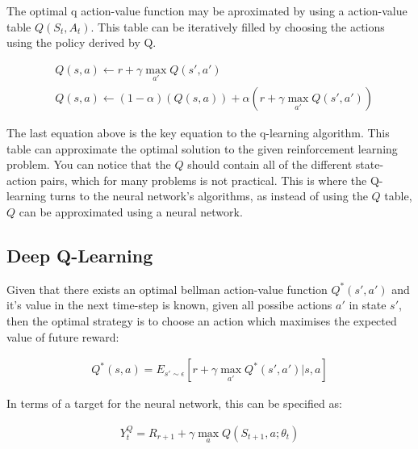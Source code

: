 The optimal q action-value function may be aproximated by using a action-value table $Q(S_{t}, A_{t})$.
This table can be iteratively filled by choosing the actions using the policy derived by Q.

\begin{align}
& Q(s,a) \leftarrow r + \gamma \max_{a'} Q(s',a') \\
& Q(s,a) \leftarrow (1-\alpha)(Q(s,a)) + \alpha(r + \gamma \max_{a'} Q(s',a'))
\label{eq:Qlearning}
\end{align}

The last equation above is the key equation to the q-learning algorithm.
This table can approximate the optimal solution to the given reinforcement learning problem.
You can notice that the $Q$ should contain all of the different state-action pairs, which for many problems is not practical.
This is where the Q-learning turns to the neural network's algorithms, as instead of using the $Q$ table, $Q$ can be approximated using a neural network.


\subsection{Deep Q-Learning}
\label{sec:dqn}

Given that there exists an optimal bellman action-value function $Q^{*}(s',a')$ \cite{https://doi.org/10.48550/arxiv.1312.5602} and it's value in the next time-step is known, given all possibe actions  $a'$ in state $s'$, then the optimal strategy is to choose an action which maximises the expected value of future reward:

\begin{align}
  Q^{*}(s,a) = E_{s' \sim \epsilon} \left[ r + \gamma \max_{a'} Q^{*}(s',a') \bigg| s,a \right]
\label{eq:deepQlearning}
\end{align}

In terms of a target for the neural network, this can be specified as:

\begin{align}
 Y_{t}^{Q} =  R_{r+1} + \gamma \max_{a} Q(S_{t+1},a; \theta_{t})
\label{eq:deepQlearningTarget}
\end{align}

